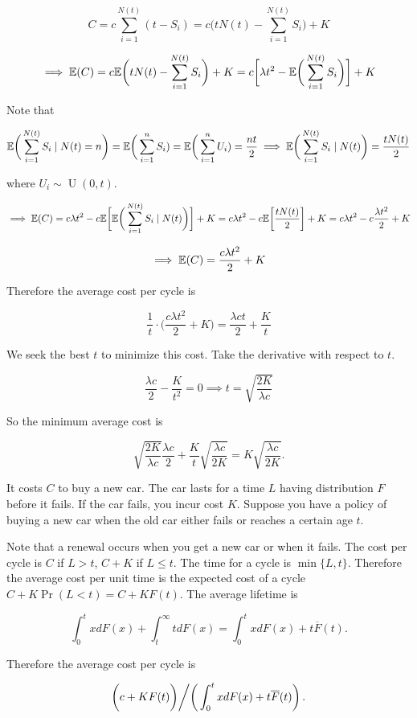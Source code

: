 \begin{solution}
\begin{enumerate}[(a)]
\[
C = c \sum_{i=1}^{N(t)} (t - S_i)  = c\bigg( t N(t) - \sum_{i=1}^{N(t)} S_i \bigg) + K
\]

\[
\implies \mathbb{E}(C) =c \mathbb{E} \bigg( t N(t) - \sum_{i=1}^{N(t)} S_i \bigg) + K = c \bigg[\lambda t^2 - \mathbb{E} \bigg( \sum_{i=1}^{N(t)}  S_i \bigg) \bigg] + K
\]

Note that

\[
 \mathbb{E} \bigg( \sum_{i=1}^{N(t)}  S_i \mid N(t) = n \bigg) =  \mathbb{E} \bigg( \sum_{i=1}^{n}  S_i ) =  \mathbb{E} \bigg( \sum_{i=1}^{n}  U_i ) = \frac{nt}{2} \implies  \mathbb{E} \bigg( \sum_{i=1}^{N(t)}  S_i \mid N(t) \bigg)  = \frac{t N(t)}{2}
\]

where \(U_i \sim \operatorname{U}(0,t)\).

\[
\implies  \mathbb{E}(C)=  c \lambda t^2 -c  \mathbb{E} \bigg[  \mathbb{E} \bigg( \sum_{i=1}^{N(t)}  S_i \mid N(t) \bigg) \bigg] + K =  c \lambda t^2 -c  \mathbb{E} \bigg[  \frac{t N(t)}{2} \bigg] + K =  c \lambda t^2 -c   \frac{\lambda t^2}{2} + K
\]

\[
\implies \mathbb{E}(C) = \frac{c \lambda t^2}{2} + K 
\]

Therefore the average cost per cycle is

\[
\frac{1}{t} \cdot \bigg( \frac{c \lambda t^2}{2} + K \bigg) = \frac{\lambda c t}{2} + \frac{K}{t}
\]

We seek the best \(t\) to minimize this cost. Take the derivative with respect to \(t\).

\[
\frac{\lambda c}{2} - \frac{K}{t^2} = 0 \implies t = \sqrt{ \frac{2 K}{\lambda c}}
\]

So the minimum average cost is

\[
  \sqrt{ \frac{2 K}{\lambda c}}\frac{\lambda c }{2} + \frac{K}{t}  \sqrt{ \frac{\lambda c}{2 K}} = K \sqrt{\frac{\lambda c}{2K}}.
  \]

\end{enumerate}


\end{solution}

\begin{example}It costs \(C\) to buy a new car. The car lasts for a time \(L\) having distribution \(F\) before it fails. If the car fails, you incur cost \(K\). Suppose you have a policy of buying a new car when the old car either fails or reaches a certain age \(t\).

\end{example}

\begin{solution} Note that a renewal occurs when you get a new car or when it fails. The cost per cycle is \(C\) if \(L > t\), \(C+K\) if \(L \leq t\). The time for a cycle is \(\min\{L, t\}\). Therefore the average cost per unit time is the expected cost of a cycle \(C + K \Pr(L< t) = C + K F(t)\). The average lifetime is 

\[
\int_0^t x dF(x) + \int_t^\infty t dF(x) = \int_0^t x dF(x) + t \overline{F}(t).
\]

Therefore the average cost per cycle is

\[
\left( c + K F(t) \bigg) \middle/  \bigg( \int_0^t x dF(x) + t \overline{F}(t) \right).
\]

\end{solution}

